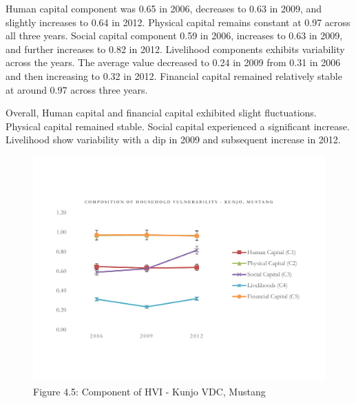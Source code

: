Human capital component was 0.65 in 2006, decreases to 0.63 in 2009, and slightly increases to 0.64 in 2012. Physical capital remains constant at 0.97 across all three years. Social capital component 0.59 in 2006, increases to 0.63 in 2009, and further increases to 0.82 in 2012. Livelihood components exhibits variability across the years. The average value decreased to 0.24 in 2009 from 0.31 in 2006 and then increasing to 0.32 in 2012. Financial capital remained relatively stable at around 0.97 across three years. 

Overall, Human capital and financial capital exhibited slight fluctuations. Physical capital remained stable. Social capital experienced a significant increase. Livelihood show variability with a dip in 2009 and subsequent increase in 2012.     	
\begin{figure}[ht]
	\vspace{-40pt}
	\includegraphics[scale=0.6]{Graphs and figures/HVI_Component_Kunjo_line.pdf}
	\vspace{-50pt}
	\captionsetup{labelformat=empty}
	\caption{Figure 4.5: Component of HVI - Kunjo VDC, Mustang}
	\setlength{\abovecaptionskip}{4pt}
	\label{fig:hvikunjocomponents}
\end{figure}

